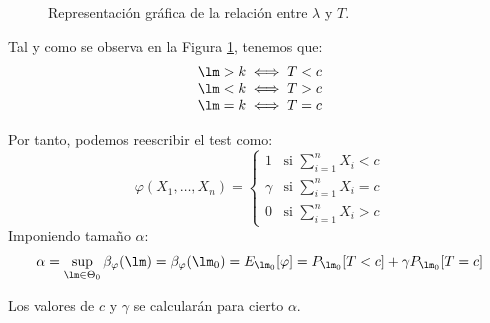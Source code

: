 \begin{ejercicio}
\begin{description}
\begin{figure}[h]
                \caption{Representación gráfica de la relación entre $\lambda$ y $T$.}
                \label{fig:lambda_T_relation_ej7.3.2}
            \end{figure}

            Tal y como se observa en la Figura \ref{fig:lambda_T_relation_ej7.3.2}, tenemos que:
            \begin{equation*}
                \begin{array}{l}
                    \lm > k \iff T < c \\
                    \lm < k \iff T > c \\
                    \lm = k \iff T = c
                \end{array}
            \end{equation*}

            Por tanto, podemos reescribir el test como:
            \begin{equation*}
                \varphi(X_1, \ldots, X_n) = \left\{\begin{array}{ll}
                    1 & \text{si\ } \sum\limits_{i=1}^{n}X_i<c \\
                     \gamma& \text{si\ } \sum\limits_{i=1}^{n}X_i = c \\
                     0 & \text{si\ } \sum\limits_{i=1}^{n}X_i > c
                \end{array}\right. 
            \end{equation*}
            Imponiendo tamaño $\alpha$:
            \begin{equation*}
                \alpha = \sup_{\lm \in \Theta_0}\beta_\varphi(\lm) = \beta_\varphi(\lm_0) = E_{\lm_0}[\varphi] = P_{\lm_0}[T < c] + \gamma P_{\lm_0}[T=c]
            \end{equation*}
            
            Los valores de $c$ y $\gamma$ se calcularán para cierto $\alpha$.
    \end{description}~\\


\end{ejercicio}
